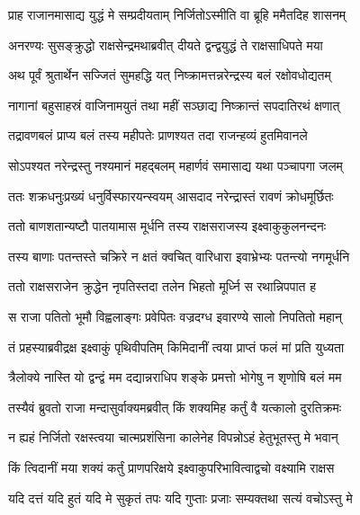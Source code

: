 \twolineshloka
{प्राह राजानमासाद्य युद्धं मे सम्प्रदीयताम्}
{निर्जितोऽस्मीति वा ब्रूहि ममैतदिह शासनम्} %

\twolineshloka
{अनरण्यः सुसङ्क्रुद्धो राक्षसेन्द्रमथाब्रवीत्}
{दीयते द्वन्द्वयुद्धं ते राक्षसाधिपते मया} %

\twolineshloka
{अथ पूर्वं श्रुतार्थेन सज्जितं सुमहद्धि यत्}
{निष्क्रामत्तन्नरेन्द्रस्य बलं रक्षोवधोद्यतम्} %

\twolineshloka
{नागानां बहुसाहस्रं वाजिनामयुतं तथा}
{महीं सञ्छाद्य निष्क्रान्तं सपदातिरथं क्षणात्} %

\twolineshloka
{तद्रावणबलं प्राप्य बलं तस्य महीपतेः}
{प्राणश्यत तदा राजन्हव्यं हुतमिवानले} %

\twolineshloka
{सोऽपश्यत नरेन्द्रस्तु नश्यमानं महद्बलम्}
{महार्णवं समासाद्य यथा पञ्चापगा जलम्} %

\twolineshloka
{ततः शक्रधनुःप्रख्यं धनुर्विस्फारयन्स्वयम्}
{आसदाद नरेन्द्रास्तं रावणं क्रोधमूर्छितः} %

\twolineshloka
{ततो बाणशतान्यष्टौ पातयामास मूर्धनि}
{तस्य राक्षसराजस्य इक्ष्वाकुकुलनन्दनः} %

\twolineshloka
{तस्य बाणाः पतन्तस्ते चक्रिरे न क्षतं क्वचित्}
{वारिधारा इवाभ्रेभ्यः पतन्त्यो नगमूर्धनि} %

\twolineshloka
{ततो राक्षसराजेन क्रुद्धेन नृपतिस्तदा}
{तलेन भिहतो मूर्ध्नि स रथान्निपपात ह} %

\twolineshloka
{स राजा पतितो भूमौ विह्वलाङ्गः प्रवेपितः}
{वज्रदग्ध इवारण्ये सालो निपतितो महान्} %

\twolineshloka
{तं प्रहस्याब्रवीद्रक्ष इक्ष्वाकुं पृथिवीपतिम्}
{किमिदानीं त्वया प्राप्तं फलं मां प्रति युध्यता} %

\twolineshloka
{त्रैलोक्ये नास्ति यो द्वन्द्वं मम दद्यान्नराधिप}
{शङ्के प्रमत्तो भोगेषु न शृणोषि बलं मम} %

\twolineshloka
{तस्यैवं ब्रुवतो राजा मन्दासुर्वाक्यमब्रवीत्}
{किं शक्यमिह कर्तुं वै यत्कालो दुरतिक्रमः} %

\twolineshloka
{न ह्यहं निर्जितो रक्षस्त्वया चात्मप्रशंसिना}
{कालेनेह विपन्नोऽहं हेतुभूतस्तु मे भवान्} %

\twolineshloka
{किं त्विदानीं मया शक्यं कर्तुं प्राणपरिक्षये}
{इक्ष्वाकुपरिभावित्वाद्वचो वक्ष्यामि राक्षस} %

\twolineshloka
{यदि दत्तं यदि हुतं यदि मे सुकृतं तपः}
{यदि गुप्ताः प्रजाः सम्यक्तथा सत्यं वचोऽस्तु मे} %

